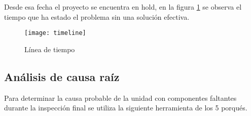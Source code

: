 Desde esa fecha el proyecto se encuentra en hold, en la figura \ref{fig:timeline} se observa el tiempo que ha estado el problema sin una soluci\'on efectiva.

\begin{figure}[htb]
  \centering
  \texttt{[image: timeline]}
  \caption{L\'inea de tiempo}
  \label{fig:timeline}
\end{figure}


\subsection{An\'alisis de causa ra\'iz}
Para determinar la causa probable de la unidad con componentes faltantes durante la
inspecci\'on final se utiliza la siguiente herramienta de los 5 porqu\'es.

